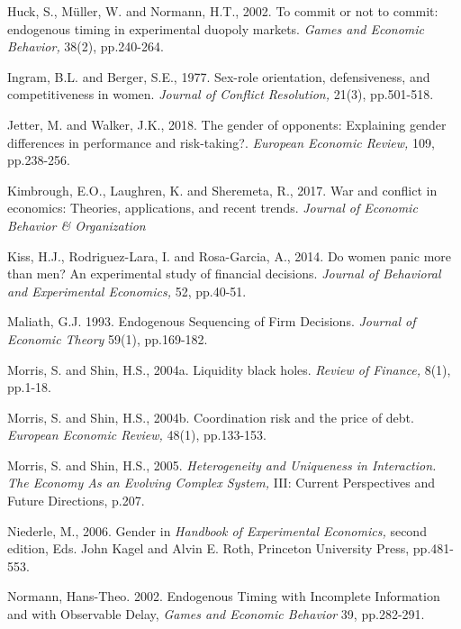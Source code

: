 \documentclass[11pt,english]{article}
\begin{document}
\begin{thebibliography}{10}
\bibitem{}Huck, S., M\"{u}ller, W. and Normann, H.T., 2002. To commit or not to commit: endogenous timing in experimental duopoly markets. \textit{Games and Economic Behavior,} 38(2), pp.240-264.

\bibitem{} Ingram, B.L. and Berger, S.E., 1977. Sex-role orientation, defensiveness, and competitiveness in women. \textit{Journal of Conflict Resolution,} 21(3), pp.501-518.

\bibitem{}Jetter, M. and Walker, J.K., 2018. The gender of opponents: Explaining gender differences in performance and risk-taking?. \textit{European Economic Review,} 109, pp.238-256.


\bibitem{} Kimbrough, E.O., Laughren, K. and Sheremeta, R., 2017. War and conflict in economics: Theories, applications, and recent trends. \textit{Journal of Economic Behavior \& Organization}

\bibitem{} Kiss, H.J., Rodriguez-Lara, I. and Rosa-Garcia, A., 2014. Do women panic more than men? An experimental study of financial decisions. \textit{Journal of Behavioral and Experimental Economics,} 52, pp.40-51.



\bibitem{} Maliath, G.J. 1993. Endogenous Sequencing of Firm Decisions. \textit{Journal of Economic Theory} 59(1), pp.169-182. 

\bibitem{} Morris, S. and Shin, H.S., 2004a. Liquidity black holes. \textit{Review of Finance,} 8(1), pp.1-18.

\bibitem{}  Morris, S. and Shin, H.S., 2004b. Coordination risk and the price of debt. \textit{European Economic Review,} 48(1), pp.133-153.

\bibitem{} Morris, S. and Shin, H.S., 2005. \textit{Heterogeneity and Uniqueness in Interaction. The Economy As an Evolving Complex System,} III: Current Perspectives and Future Directions, p.207.

\bibitem{} Niederle, M., 2006. Gender in \textit{Handbook of Experimental Economics,} second edition, Eds. John Kagel and Alvin E. Roth, Princeton University Press, pp.481-553.

\bibitem{} Normann, Hans-Theo. 2002. Endogenous Timing with Incomplete Information and with Observable Delay, \textit{Games and Economic Behavior} 39, pp.282-291.


\end{thebibliography}
\end{document}
